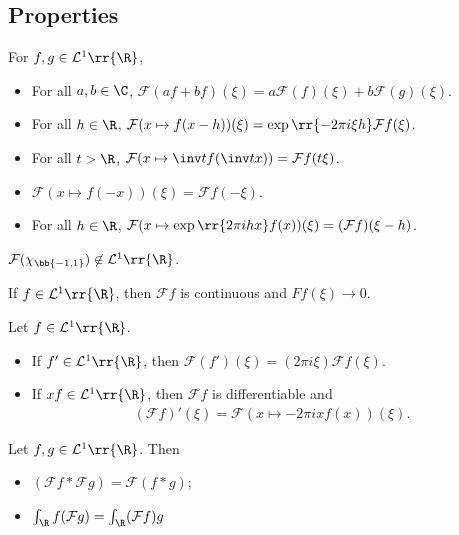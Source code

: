 \documentclass{article}
\begin{document}
\subsection{Properties}

\begin{theorem}
  For $f,g\in\mathcal L^1\rr{\R}$,
  \begin{itemize}
    \item For all $a,b\in\C$,
      $\mathcal F(af + bf)(\xi) = a\mathcal F(f)(\xi) + b\mathcal F(g)(\xi)$.
    \item For all $h\in\R$, $\mathcal F(x\mapsto f(x-h))(\xi) = \exp\rr{-2\pi i\xi
      h}\mathcal Ff(\xi)$.
    \item For all $t>\R$,
      $\mathcal F(x\mapsto\inv tf(\inv tx)) = \mathcal Ff(t\xi)$.
    \item $\mathcal F(x\mapsto f(-x))(\xi) = \mathcal Ff(-\xi)$.
    \item For all $h\in\R$, $\mathcal F(x\mapsto\exp\rr{2\pi ihx}f(x))(\xi) = (\mathcal Ff)(\xi - h)$.
  \end{itemize}
\end{theorem}

\begin{example}
  $\mathcal F(\chi_{\bb{-1,1}})\not\in\mathcal L^1\rr{\R}$.
\end{example}

\begin{theorem}
  If $f\in\mathcal L^1\rr{\R}$, then $\mathcal Ff$ is continuous
  and $Ff(\xi)\to 0$.
\end{theorem}

\begin{proposition}
  Let $f\in\mathcal L^1\rr{\R}$.
  \begin{itemize}
    \item If $f'\in\mathcal L^1\rr{\R}$, then $\mathcal F(f')(\xi) = (2\pi i\xi)\mathcal Ff(\xi)$.
    \item If $xf\in\mathcal L^1\rr{\R}$, then $\mathcal Ff$ is
      differentiable and
      \begin{align*}
        (\mathcal Ff)'(\xi) = \mathcal F(x\mapsto-2\pi ixf(x))(\xi).
      \end{align*}
  \end{itemize}
\end{proposition}


\begin{lemma}
  Let $f,g\in\mathcal L^1\rr{\R}$. Then
  \begin{itemize}
    \item $(\mathcal Ff*\mathcal Fg)=\mathcal F(f*g)$;
    \item $\int_\R f(\mathcal Fg) = \int_\R (\mathcal F f) g$
  \end{itemize}
\end{lemma}
\end{document}
